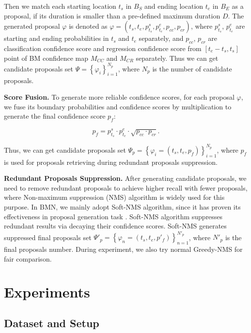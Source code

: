 \documentclass[10pt,twocolumn,letterpaper]{article}
\begin{document}
Then we match each starting location $t_s$ in $B_S$ and ending location $t_e$ in $B_E$ as a  proposal, if its duration is smaller than a pre-defined maximum duration $D$.
The generated  proposal $\varphi$ is denoted as  $\varphi =(t_{s},t_{e},p_{t_{s}}^s,p_{t_{e}}^e,p_{cc},p_{cr})$, where $p_{t_{s}}^s$, $p_{t_{e}}^e$ are starting and ending probabilities in $t_{s}$ and $t_{e}$ separately, and $p_{cc}$, $p_{cr}$ are classification confidence score and regression confidence score from $[t_e-t_s,t_s]$ point of BM confidence map $M_{CC}$ and $M_{CR}$ separately.
Thus we can get candidate proposals set $\Psi=\left \{ \varphi_i \right \}_{i=1}^{N_p}$, where $N_p$ is the number of candidate proposals.

\noindent
\textbf{Score Fusion.}
To generate more reliable confidence scores, for each proposal $\varphi$, we fuse its boundary probabilities and confidence scores by multiplication to generate the final confidence score $p_f$:

\begin{equation}
p_f = p_{t_{s}}^s \cdot p_{t_{e}}^e \cdot \sqrt{p_{cc}\cdot p_{cr}}.
\end{equation}

Thus, we can get candidate proposals set $\Psi_p=\left \{ \varphi_i = (t_s,t_e,p_f) \right \}_{i=1}^{N_p}$, where $p_f$ is used for proposals retrieving during redundant proposals suppression. 


\noindent
\textbf{Redundant Proposals Suppression.}
After generating candidate proposals, we need to remove redundant proposals to achieve higher recall with fewer proposals, where Non-maximum suppression (NMS) algorithm is widely used for this purpose.
In BMN, we mainly adopt Soft-NMS algorithm\cite{softNMS}, since it has proven its effectiveness in proposal generation task \cite{lin2018bsn}. Soft-NMS algorithm suppresses redundant results via decaying their confidence scores.
Soft-NMS generates suppressed final proposals set $\Psi'_p  = \left \{ \varphi  _n=(t_s,t_e,p'_f  ) \right \}_{n=1}^{N'_p}$, where $N'_p$ is the final proposals number.
During experiment, we also try normal Greedy-NMS for fair comparison.


\section{Experiments}

\subsection{Dataset and Setup }
\end{document}

